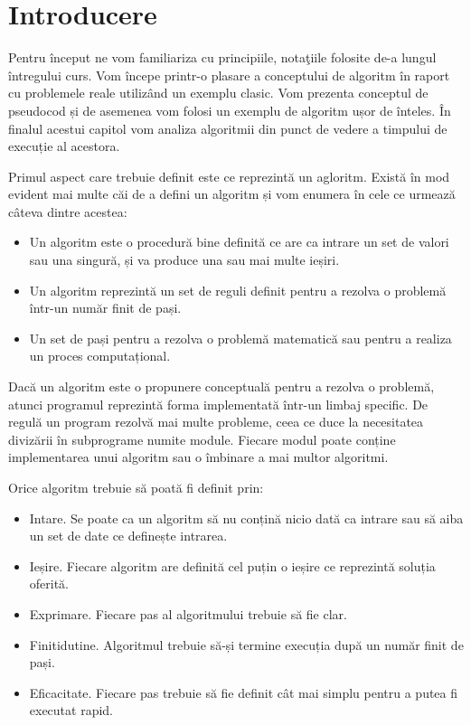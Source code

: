 \chapter{Introducere}
\label{intro}%

Pentru început ne vom familiariza cu principiile, notaţiile folosite de-a lungul întregului curs.
Vom începe printr-o plasare a conceptului de algoritm în raport cu problemele reale utilizând un exemplu clasic. Vom prezenta conceptul de pseudocod și de asemenea vom folosi un exemplu de algoritm ușor de înteles. În finalul acestui capitol vom analiza algoritmii din punct de vedere a timpului de execuție al acestora. 

Primul aspect care trebuie definit este ce reprezintă un agloritm. Există în mod evident mai multe căi de a defini un algoritm și vom enumera în cele ce urmează câteva dintre acestea:

\begin{itemize}
\item \large{Un algoritm este o procedură bine definită ce are ca intrare un set de valori sau una singură, și va produce una sau mai multe ieșiri.}
\item \large{Un algoritm reprezintă un set de reguli definit pentru a rezolva o problemă într-un număr finit de pași.}
\item \large{Un set de pași pentru a rezolva o problemă matematică sau pentru a realiza un proces computațional.}
\end{itemize}

Dacă un algoritm este o propunere conceptuală pentru a rezolva o problemă, atunci programul reprezintă forma implementată într-un limbaj specific. De regulă un program rezolvă mai multe probleme, ceea ce duce la necesitatea divizării în subprograme numite module. Fiecare modul poate conține implementarea unui algoritm sau o îmbinare a mai multor algoritmi.

Orice algoritm trebuie să poată fi definit prin:

\begin{itemize}
	\item {Intare. Se poate ca un algoritm să nu conțină nicio dată ca intrare sau să aiba un set de date ce definește intrarea.}
	\item {Ieșire. Fiecare algoritm are definită cel puțin o ieșire ce reprezintă soluția oferită.}
	\item {Exprimare. Fiecare pas al algoritmului trebuie să fie clar.}
	\item {Finitidutine. Algoritmul trebuie să-și termine execuția după un număr finit de pași.}
	\item {Eficacitate. Fiecare pas trebuie să fie definit cât mai simplu pentru a putea fi executat rapid.}
	
\end{itemize}

